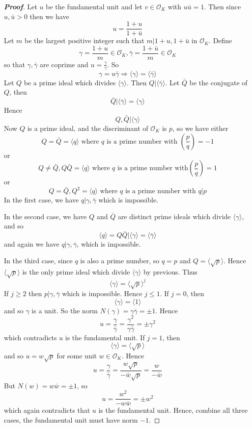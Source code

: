 \begin{proof}[\bf Proof] Let $u$ be the fundamental unit and let $v \in \mathcal{O}_K$ with $u\bar{u}=1$.
Then since $u,\bar{u}>0$ then we have
$$u=\frac{1+u}{1+\bar{u}}$$
Let $m$ be the largest positive integer such that $m|1+u,1+\bar{u}$ in $\mathcal{O}_K$.
Define
$$\gamma=\frac{1+u}{m} \in \mathcal{O}_K,\bar{\gamma}=\frac{1+\bar{u}}{m} \in \mathcal{O}_K$$
so that $\gamma,\bar{\gamma}$ are coprime and $u=\frac{\gamma}{\bar{\gamma}}$. So
$$\gamma=u\bar{\gamma} \Rightarrow \langle \gamma \rangle=\langle \bar{\gamma} \rangle$$
Let $Q$ be a prime ideal which divides
$\langle \gamma \rangle$. Then $Q \big|\langle \bar{\gamma} \rangle$.
Let $\bar{Q}$ be the conjugate of $Q$, then
$$\bar{Q} \big| \langle \bar{\gamma}\rangle=\langle \gamma \rangle$$
Hence
$$Q,\bar{Q} \big|\langle \gamma \rangle$$
Now $Q$ is a prime ideal, and the discriminant of $\mathcal{O}_K$ is $p$, so we have either
$$Q=\bar{Q}=\langle q \rangle \text{ where } q \text{ is a prime number with }\left(\frac{p}{q}\right)=-1$$
or
$$Q \neq \bar{Q}, Q\bar{Q}=\langle q \rangle \text{ where } q \text{ is a prime number with} \left(\frac{p}{q}\right)=1$$
or
$$Q =\bar{Q}, Q^2=\langle q \rangle \text{ where } q \text{ is a prime number with } q|p$$
In the first case, we have $q|\gamma, \bar{\gamma}$ which is impossible.

In the second case, we have $Q$ and $\bar{Q}$ are distinct prime ideals which divide $\langle \gamma \rangle$, and
so
$$\langle q \rangle =Q\bar{Q} \big|\langle \gamma \rangle=\langle \bar{\gamma} \rangle$$
and again we have $q|\gamma,\bar{\gamma}$, which is impossible.

In the third case, since $q$ is also a prime number, so $q=p$ and $Q=\langle \sqrt{p} \rangle$. Hence
$\langle \sqrt{p} \rangle$ is the only prime ideal which divide $\langle \gamma \rangle$ by previous.
Thus
$$\langle \gamma \rangle=\langle \sqrt{p} \rangle^j$$
If $j \ge 2$ then $p|\gamma,\bar{\gamma}$ which is impossible. Hence $j \le 1$.
If $j=0$, then $$\langle \gamma \rangle=\langle 1 \rangle$$ and so $\gamma$ is a unit.
So the norm $N(\gamma)=\gamma \bar{\gamma}=\pm 1$.
Hence
$$u=\frac{\gamma}{\bar{\gamma}}=\frac{\gamma^2}{\gamma \bar{\gamma}}=\pm \gamma^2$$
which contradicts $u$ is the fundamental unit. If $j=1$, then
$$\langle \gamma \rangle=\langle \sqrt{p} \rangle$$
and so $u=w\sqrt{p}$ for some unit $w \in \mathcal{O}_K$.
Hence
$$u=\frac{\gamma}{\bar{\gamma}}=\frac{w \sqrt{p}}{-\bar{w}\sqrt{p}}=\frac{w}{-\bar{w}}$$
But $N(w)=w\bar{w}=\pm 1$, so
$$u=\frac{w^2}{-w\bar{w}}=\pm w^2$$
which again contradicts that $u$ is the fundamental unit. Hence, combine all three cases, the fundamental unit must have norm $-1$.
\end{proof}

